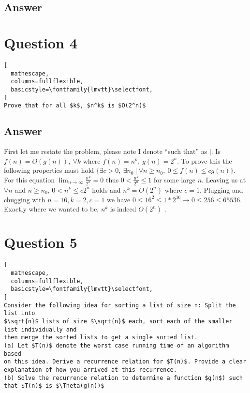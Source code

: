 \documentclass{article}
\begin{document}
\subsection*{Answer}
\newpage
\section*{Question 4}
\begin{lstlisting}[
  mathescape,
  columns=fullflexible,
  basicstyle=\fontfamily{lmvtt}\selectfont,
]
Prove that for all $k$, $n^k$ is $O(2^n)$
\end{lstlisting}
\subsection*{Answer}
First let me restate the problem, please note I denote ``such that'' as $|$.\newline
Is $f(n)=O(g(n)), \ \forall k$ where $f(n)=n^k ,\ g(n)=2^n$.\newline
To prove this the following properties must hold 
$\{ \exists c  > 0, \ \exists n_0 \ | \ \forall n \geq n_0,  \ 0 \leq f(n) \leq cg(n) \}$.\newline
For this equation $\displaystyle \lim_{n \to \infty}\frac{n^k}{2^n}=0$ thus $0 < \frac{n^k}{2^n} \leq 1$ for some
large $n$.\newline 
Leaving us at $\forall n$ and $n \geq n_0$, $0 < n^k \leq c2^n$ holds and $n^k=O(2^n)$ where $c =1$.\newline
Plugging and chugging  with $n=16,k=2,c=1$ we have $0 \leq 16^2 \leq 1*2^{16} \to 0 \leq 256 \leq 65536$. \newline 
Exactly where we wanted to be, $n^k$ is indeed $O(2^n)$ .

\section*{Question 5}
\begin{lstlisting}[
  mathescape,
  columns=fullflexible,
  basicstyle=\fontfamily{lmvtt}\selectfont,
]
Consider the following idea for sorting a list of size n: Split the list into
$\sqrt{n}$ lists of size $\sqrt{n}$ each, sort each of the smaller list individually and
then merge the sorted lists to get a single sorted list.
(a) Let $T(n)$ denote the worst case running time of an algorithm based
on this idea. Derive a recurrence relation for $T(n)$. Provide a clear
explanation of how you arrived at this recurrence.
(b) Solve the recurrence relation to determine a function $g(n$) such
that $T(n)$ is $\Theta(g(n))$
\end{lstlisting}
\end{document}
